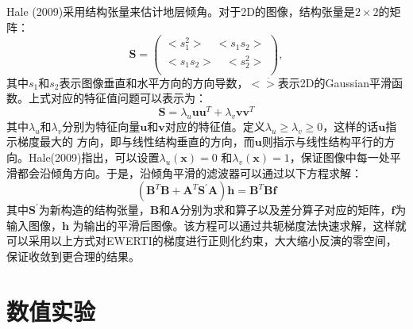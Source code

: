 Hale (2009)\cite{Hale2009Structure}采用结构张量来估计地层倾角。对于2D的图像，结构张量是$2\times2$的矩阵：
\begin{equation}
        \mathbf{S}=
        \begin{pmatrix}
                < s^2_1 > \quad <s_1s_2 >\\
                < s_1s_2 > \quad < s^2_2 >\\
        \end{pmatrix},
        \label{eq:StructureTensor}
\end{equation}
其中$s_1$和$s_2$表示图像垂直和水平方向的方向导数，$<\dot>$表示2D的Gaussian平滑函数。上式对应的特征值问题可以表示为：
\begin{equation}
	\mathbf{S}=\lambda_u\mathbf{u}\mathbf{u}^T+\lambda_v\mathbf{v}\mathbf{v}^T
        \label{eq:EigenValueVector}
\end{equation}
其中$\lambda_u$和$\lambda_v$分别为特征向量$\mathbf{u}$和$\mathbf{v}$对应的特征值。定义$\lambda_u\ge\lambda_v\ge0$，这样的话$\mathbf{u}$指示梯度最大的
方向，即与线性结构垂直的方向，而$\mathbf{u}$则指示与线性结构平行的方向。Hale(2009)\cite{Hale2009Structure}指出，可以设置$\lambda_u(\mathbf{x})=0$
和$\lambda_v(\mathbf{x})=1$，保证图像中每一处平滑都会沿倾角方向。于是，沿倾角平滑的滤波器可以通过以下方程求解：
\begin{equation}
	(\mathbf{B}^T\mathbf{B}+\mathbf{A}^T\mathbf{S}^{\prime}\mathbf{A})\mathbf{h}=\mathbf{B}^T\mathbf{B}\mathbf{f}
        \label{eq:SparseMatrixSystem}
\end{equation}
其中$\mathbf{S}^{\prime}$为新构造的结构张量，$\mathbf{B}$和$\mathbf{A}$分别为求和算子以及差分算子对应的矩阵，$\mathbf{f}$为输入图像，$\mathbf{h}$
为输出的平滑后图像。该方程可以通过共轭梯度法快速求解，这样就可以采用以上方式对EWERTI的梯度进行正则化约束，大大缩小反演的零空间，保证收敛到更合理的结果。

\section{数值实验}
